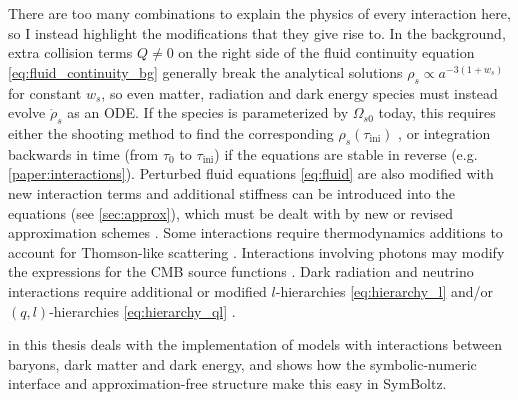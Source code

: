 \documentclass[USenglish, thumbmarks]{uiophdthesis} %
\newcommand\ini{\mathrm{ini}}
\begin{document}
There are too many combinations to explain the physics of every interaction here,
so I instead highlight the modifications that they give rise to.
In the background, extra collision terms $Q \neq 0$ on the right side of the fluid continuity equation \eqref{eq:fluid_continuity_bg}
generally break the analytical solutions $\rho_s \propto a^{-3(1+w_s)}$ for constant $w_s$,
so even matter, radiation and dark energy species must instead evolve $\dot\rho_s$ as an ODE.
If the species is parameterized by $\Omega_{s0}$ today,
this requires either the shooting method to find the corresponding $\rho_s(\tau_\ini)$ \cite[e.g.][]{audrenStrongestModelindependentBound2014a},
or integration backwards in time (from $\tau_0$ to $\tau_\ini$) if the equations are stable in reverse (e.g. \cref{paper:interactions}).
Perturbed fluid equations \eqref{eq:fluid} are also modified with new interaction terms
and additional stiffness can be introduced into the equations (see \cref{sec:approx}),
which must be dealt with by new or revised approximation schemes \cite[e.g.][]{blasCosmicLinearAnisotropy2011c,archidiaconoLinearScaleBounds2017,archidiaconoConstrainingDarkMatter2019,beckerCosmologicalConstraintsMultiinteracting2021a,heBoundsVelocityDependentDark2025}.
Some interactions require thermodynamics additions to account for Thomson-like scattering \cite[e.g.][]{wilkinsonUsingCMBAngular2014}.
Interactions involving photons may modify the expressions for the CMB source functions \cite[e.g.][]{wilkinsonUsingCMBAngular2014,muraiIsotropicCosmicBirefringence2023}.
Dark radiation and neutrino interactions require additional or modified $l$-hierarchies \eqref{eq:hierarchy_l} and/or $(q,l)$-hierarchies \eqref{eq:hierarchy_ql} \cite[e.g.][]{oldengottBoltzmannHierarchyInteracting2015,oldengottInteractingNeutrinosCosmology2017}.

 in this thesis deals with the implementation of models with interactions
between baryons, dark matter and dark energy,
and shows how the symbolic-numeric interface and approximation-free structure make this easy in SymBoltz.
\end{document}
